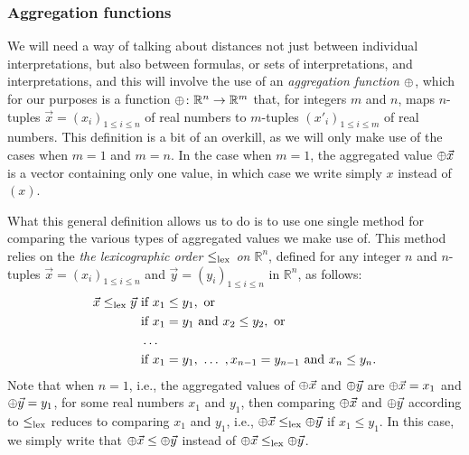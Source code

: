 \subsubsection{Aggregation functions}
We will need a way of talking about distances not just between individual interpretations,
but also between formulas, or sets of interpretations, and interpretations,
and this will involve the use of an 
\emph{aggregation function ${\operatorname{\oplus}}$},
which for our purposes 
is a function ${\operatorname{\oplus}}\colon\mathbb{R}^n\rightarrow\mathbb{R}^m$ that,
for integers $m$ and $n$,
maps $n$-tuples $\vec{x} = (x_i)_{1\le i\le n}$ of real numbers 
to $m$-tuples $(x'_i)_{1\le i\le m}$ of real numbers.
This definition is a bit of an overkill, as we will only make use of the cases 
when $m=1$ and $m=n$.
In the case when $m=1$, the aggregated value ${\operatorname{\oplus}}\vec{x}$ 
is a vector containing only one value,
in which case we write simply $x$ instead of $(x)$.

What this general definition allows us to do is to use
one single method for comparing the various types of aggregated values
we make use of.
This method relies on
the \emph{the lexicographic order $\le_{{\operatorname{lex}}}$ on $\mathbb{R}^{n}$}, 
defined for any integer $n$ and $n$-tuples 
$\vec{x} = (x_i)_{1\le i\le n}$ and $\vec{y} = (y_i)_{1\le i\le n}$ in $\mathbb{R}^{n}$,
as follows:
\begin{align*}
	\vec{x}\le_{{\operatorname{lex}}} \vec{y}~&\text{if}~x_1\le y_1,~\text{or}\\
													  &\text{if}~x_1 = y_1~\text{and}~x_2\le y_2,~\text{or}\\
													  &\dots\\
													  &\text{if}~x_1 = y_1,~\dots~,x_{n-1} = y_{n-1}~\text{and}~x_n\le y_n.
\end{align*}
Note that when $n=1$, i.e., the aggregated values of ${\operatorname{\oplus}}\vec{x}$ and ${\operatorname{\oplus}}\vec{y}$
are ${\operatorname{\oplus}}\vec{x}=x_1$ and ${\operatorname{\oplus}}\vec{y}=y_1$,
for some real numbers $x_1$ and $y_1$,
then comparing ${\operatorname{\oplus}}\vec{x}$ and ${\operatorname{\oplus}}\vec{y}$ 
according to $\le_{\operatorname{lex}}$ reduces to comparing $x_1$ and $y_1$, 
i.e., ${\operatorname{\oplus}}\vec{x}\le_{\operatorname{lex}}{\operatorname{\oplus}}\vec{y}$ if $x_1\le y_1$.
In this case, we simply write that ${\operatorname{\oplus}}\vec{x}\le{\operatorname{\oplus}}\vec{y}$ 
instead of ${\operatorname{\oplus}}\vec{x}\le_{{\operatorname{lex}}}{\operatorname{\oplus}}\vec{y}$.

